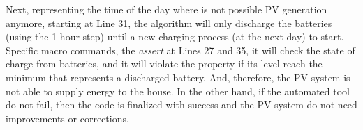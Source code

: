 \documentclass[journal]{IEEEtran}
\begin{document}
Next, representing the time of the day where is not possible PV generation anymore, starting at Line 31, the algorithm will only discharge the batteries (using the 1 hour step) until a new charging process (at the next day) to start. Specific macro commands, the \textit{assert} at Lines 27 and 35, it will check the state of charge from batteries, and it will violate the property if its level reach the minimum that represents a discharged battery. And, therefore, the PV system is not able to supply energy to the house. In the other hand, if the automated tool do not fail, then the code is finalized with success and the PV system do not need improvements or corrections.
%
\end{document}
